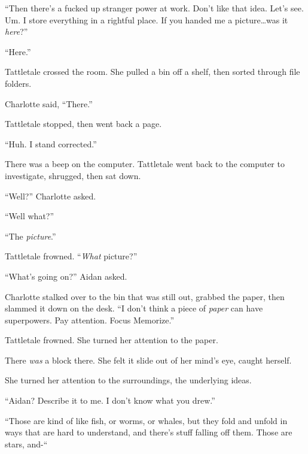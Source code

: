 ``Then there's a fucked up stranger power at work.  Don't like that idea.  Let's see.  Um.  I store everything in a rightful place.  If you handed me a picture\ldots was it \emph{here}?''



``Here.''



Tattletale crossed the room.  She pulled a bin off a shelf, then sorted through file folders.



Charlotte said, ``There.''



Tattletale stopped, then went back a page.



``Huh.  I stand corrected.''



There was a beep on the computer.  Tattletale went back to the computer to investigate, shrugged, then sat down.



``Well?'' Charlotte asked.



``Well what?''



``The \emph{picture}.''



Tattletale frowned.  ``\emph{What} picture?''



``What's going on?'' Aidan asked.



Charlotte stalked over to the bin that was still out, grabbed the paper, then slammed it down on the desk.  ``I don't think a piece of \emph{paper }can have superpowers.  Pay attention.  Focus  Memorize.''



Tattletale frowned.  She turned her attention to the paper.



There \emph{was} a block there.  She felt it slide out of her mind's eye, caught herself.



She turned her attention to the surroundings, the underlying ideas.



``Aidan?  Describe it to me.  I don't know what you drew.''



``Those are kind of like fish, or worms, or whales, but they fold and unfold in ways that are hard to understand, and there's stuff falling off them.  Those are stars, and-``



